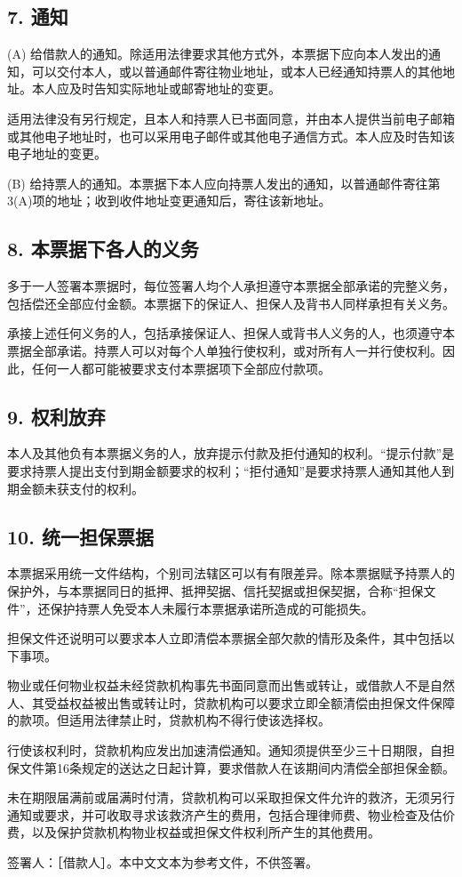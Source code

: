 \documentclass[UTF8,fontset=none,11pt,a4paper]{ctexart}
\begin{document}
\subsection*{7. 通知}
(A) 给借款人的通知。除适用法律要求其他方式外，本票据下应向本人发出的通知，可以交付本人，或以普通邮件寄往物业地址，或本人已经通知持票人的其他地址。本人应及时告知实际地址或邮寄地址的变更。


适用法律没有另行规定，且本人和持票人已书面同意，并由本人提供当前电子邮箱或其他电子地址时，也可以采用电子邮件或其他电子通信方式。本人应及时告知该电子地址的变更。


(B) 给持票人的通知。本票据下本人应向持票人发出的通知，以普通邮件寄往第3(A)项的地址；收到收件地址变更通知后，寄往该新地址。


\subsection*{8. 本票据下各人的义务}
多于一人签署本票据时，每位签署人均个人承担遵守本票据全部承诺的完整义务，包括偿还全部应付金额。本票据下的保证人、担保人及背书人同样承担有关义务。


承接上述任何义务的人，包括承接保证人、担保人或背书人义务的人，也须遵守本票据全部承诺。持票人可以对每个人单独行使权利，或对所有人一并行使权利。因此，任何一人都可能被要求支付本票据项下全部应付款项。


\subsection*{9. 权利放弃}
本人及其他负有本票据义务的人，放弃提示付款及拒付通知的权利。“提示付款”是要求持票人提出支付到期金额要求的权利；“拒付通知”是要求持票人通知其他人到期金额未获支付的权利。


\subsection*{10. 统一担保票据}
本票据采用统一文件结构，个别司法辖区可以有有限差异。除本票据赋予持票人的保护外，与本票据同日的抵押、抵押契据、信托契据或担保契据，合称“担保文件”，还保护持票人免受本人未履行本票据承诺所造成的可能损失。


担保文件还说明可以要求本人立即清偿本票据全部欠款的情形及条件，其中包括以下事项。


物业或任何物业权益未经贷款机构事先书面同意而出售或转让，或借款人不是自然人、其受益权益被出售或转让时，贷款机构可以要求立即全额清偿由担保文件保障的款项。但适用法律禁止时，贷款机构不得行使该选择权。


行使该权利时，贷款机构应发出加速清偿通知。通知须提供至少三十日期限，自担保文件第16条规定的送达之日起计算，要求借款人在该期间内清偿全部担保金额。


未在期限届满前或届满时付清，贷款机构可以采取担保文件允许的救济，无须另行通知或要求，并可收取寻求该救济产生的费用，包括合理律师费、物业检查及估价费，以及保护贷款机构物业权益或担保文件权利所产生的其他费用。


签署人：［借款人］。本中文文本为参考文件，不供签署。
\end{document}
